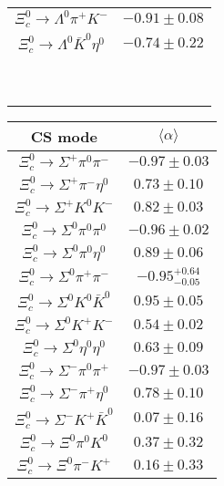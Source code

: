 \begin{table}
{\begin{tabular}{|c|c|}
			$\Xi_{c}^{0} \to  \Lambda^{0} \pi^{+} K^{-} $ & $      -0.91 \pm       0.08 $ \\
			$\Xi_{c}^{0} \to \Lambda^{0} \bar{K}^{0} \eta^{0} $ & $      -0.74 \pm       0.22 $ \\
			&\\
			&\\
			&\\
			&\\
			&\\
			&\\
			&\\
			&\\
			&\\
			\hline
		\end{tabular}
		\begin{tabular}{|c|c|}
			\hline
			CS mode&$\langle \alpha \rangle$\\
			\hline
			$\Xi_{c}^{0} \to  \Sigma^{+} \pi^{0} \pi^{-} $ & $      -0.97 \pm       0.03 $ \\
			$\Xi_{c}^{0} \to  \Sigma^{+} \pi^{-} \eta^{0} $ & $       0.73 \pm       0.10 $ \\
			$\Xi_{c}^{0} \to  \Sigma^{+} K^{0} K^{-} $ & $       0.82 \pm       0.03 $ \\
			$\Xi_{c}^{0} \to  \Sigma^{0} \pi^{0} \pi^{0} $ & $      -0.96 \pm       0.02 $ \\
			$\Xi_{c}^{0} \to  \Sigma^{0} \pi^{0} \eta^{0} $ & $       0.89 \pm       0.06 $ \\
			$\Xi_{c}^{0} \to  \Sigma^{0} \pi^{+} \pi^{-} $ & $      -0.95 ^{+ 0.64}_{-0.05} $ \\
			$\Xi_{c}^{0} \to  \Sigma^{0} K^{0} \bar{K}^{0} $ & $       0.95 \pm       0.05 $ \\
			$\Xi_{c}^{0} \to  \Sigma^{0} K^{+} K^{-} $ & $       0.54 \pm       0.02 $ \\
			$\Xi_{c}^{0} \to  \Sigma^{0} \eta^{0} \eta^{0} $ & $       0.63 \pm       0.09 $ \\
			$\Xi_{c}^{0} \to  \Sigma^{-} \pi^{0} \pi^{+} $ & $      -0.97 \pm       0.03 $ \\
			$\Xi_{c}^{0} \to  \Sigma^{-} \pi^{+} \eta^{0} $ & $       0.78 \pm       0.10 $ \\
			$\Xi_{c}^{0} \to  \Sigma^{-} K^{+} \bar{K}^{0} $ & $       0.07 \pm       0.16 $ \\
			$\Xi_{c}^{0} \to  \Xi^{0} \pi^{0} K^{0} $ & $       0.37 \pm       0.32 $ \\
			$\Xi_{c}^{0} \to \Xi^{0} \pi^{-} K^{+} $ & $       0.16 \pm       0.33 $ \\

\end{tabular}}
\end{table}
